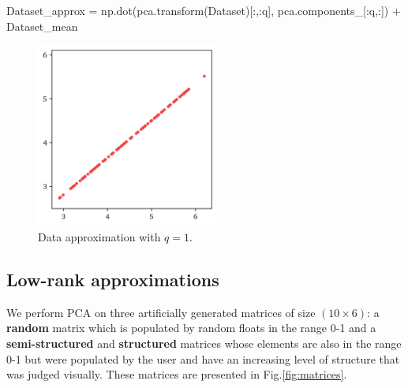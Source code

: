 \documentclass[10pt,twocolumn]{article}
\begin{document}
\begin{python}
Dataset_approx = 
np.dot(pca.transform(Dataset)[:,:q], 
pca.components_[:q,:]) + Dataset_mean
\end{python}

\begin{figure}[H]
\centering\includegraphics[width=6cm]{python-data-approximation.png}
\caption{Data approximation with $q = 1$.}
\label{fig:python-data-approximation}
\end{figure}

\subsection{Low-rank approximations}

We perform PCA on three artificially generated matrices of size $(10 \times 6)$: a \textbf{random} matrix which is populated by random floats in the range 0-1 and a \textbf{semi-structured} and \textbf{structured} matrices whose elements are also in the range 0-1 but were populated by the user and have an increasing level of structure that was judged visually. These matrices are presented in Fig.\ref{fig:matrices}.
\end{document}

